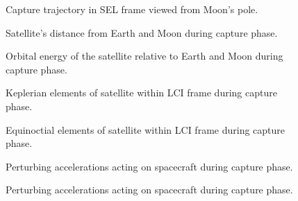 \begin{figure}
\centering
\def\svgwidth{\figurewidth}

\caption{Capture trajectory in SEL frame viewed from Moon's pole.}
\label{fig:Capture-3D-sel-above}
\end{figure}

%

\begin{figure}
\centering
\def\svgwidth{\figurewidth}

\caption{Satellite's distance from Earth and Moon during capture phase.}
\label{fig:Capture-dist}
\end{figure}

\begin{figure}
\centering
\def\svgwidth{\figurewidth}

\caption{Orbital energy of the satellite relative to Earth and Moon during capture phase.}
\label{fig:Capture-orbeng}
\end{figure}

\begin{figure}
\centering
\def\svgwidth{\figurewidth}

\caption{Keplerian elements of satellite within LCI frame during capture phase.}
\label{fig:Capture-kep-lci}
\end{figure}

\begin{figure}
\centering
\def\svgwidth{\figurewidth}

\caption{Equinoctial elements of satellite within LCI frame during capture phase.}
\label{fig:Capture-mee}
\end{figure}


\begin{figure}
\centering
\def\svgwidth{\figurewidth}

\caption{Perturbing accelerations acting on spacecraft during capture phase.}
\label{fig:Capture-pert}
\end{figure}

\begin{figure}
\centering
\def\svgwidth{\figurewidth}

\caption{Perturbing accelerations acting on spacecraft during capture phase.}
\label{fig:Capture-pert2}
\end{figure}

